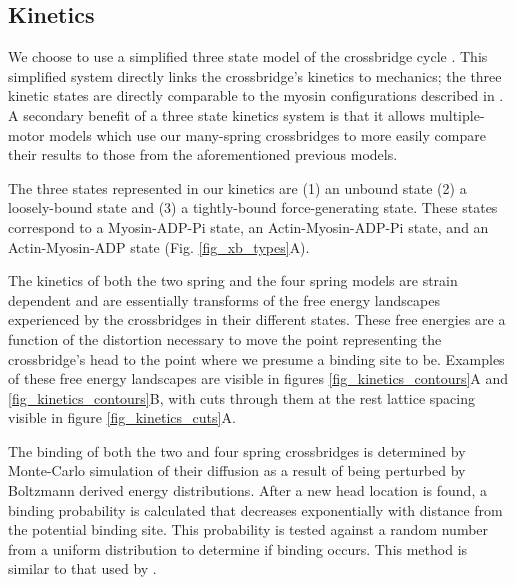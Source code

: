 \documentclass[]{article}
\begin{document}
\subsection*{Kinetics} %
We choose to use a simplified three state model of the crossbridge cycle \citep{Pate1989, Tanner:2007:pe115}. 
This simplified system directly links the crossbridge's kinetics to mechanics; the three kinetic states are directly comparable to the myosin configurations described in \citet{Houdusse:2000:p11238}.
A secondary benefit of a three state kinetics system is that it allows multiple-motor models which use our many-spring crossbridges to more easily compare their results to those from the aforementioned previous models.

The three states represented in our kinetics are (1) an unbound state (2) a loosely-bound state and (3) a tightly-bound force-generating state.
These states correspond to a Myosin-ADP-Pi state, an Actin-Myosin-ADP-Pi state, and an Actin-Myosin-ADP state (Fig. \ref{fig_xb_types}A).

The kinetics of both the two spring and the four spring models are strain dependent and are essentially transforms of the free energy landscapes experienced by the crossbridges in their different states.
These free energies are a function of the distortion necessary to move the point representing the crossbridge's head to the point where we presume a binding site to be.
Examples of these free energy landscapes are visible in figures \ref{fig_kinetics_contours}A and \ref{fig_kinetics_contours}B, with cuts through them at the rest lattice spacing visible in figure \ref{fig_kinetics_cuts}A.

The binding of both the two and four spring crossbridges is determined by Monte-Carlo simulation of their diffusion as a result of being perturbed by Boltzmann derived energy distributions. 
After a new head location is found, a binding probability is calculated that decreases exponentially with distance from the potential binding site. 
This probability is tested against a random number from a uniform distribution to determine if binding occurs.
This method is similar to that used by \citet{Tanner:2007:pe115}. 
\end{document}
